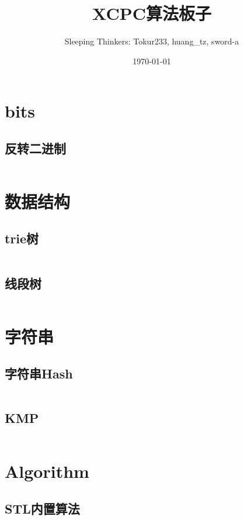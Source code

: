 \documentclass[openany,a4paper]{book}
\title{XCPC算法板子}
\author{Sleeping Thinkers: Tokur233, huang\_tz, sword-a}
\date{\today}
\begin{document}
\maketitle

\tableofcontents

\chapter{bits}

\section{反转二进制}
\inputminted{cpp}{Bits/bits.h}

\chapter{数据结构}

\section{trie树}
\inputminted{cpp}{DataStructure/trie.h}

\section{线段树}
\inputminted{cpp}{DataStructure/segmentTree.h}

\chapter{字符串}

\section{字符串Hash}
\inputminted{cpp}{String/hash.h}

\section{KMP}
\inputminted{cpp}{String/kmp.h}

\chapter{Algorithm}

\section{STL内置算法}
\inputminted{cpp}{Algorithm/STL.h}
\end{document}
